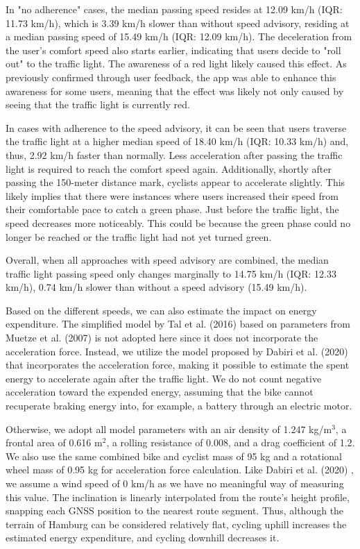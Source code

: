 In "no adherence" cases, the median passing speed resides at 12.09 km/h (IQR: 11.73 km/h), which is 3.39 km/h slower than without speed advisory, residing at a median passing speed of 15.49 km/h (IQR: 12.09 km/h). The deceleration from the user's comfort speed also starts earlier, indicating that users decide to "roll out" to the traffic light. The awareness of a red light likely caused this effect. As previously confirmed through user feedback, the app was able to enhance this awareness for some users, meaning that the effect was likely not only caused by seeing that the traffic light is currently red.

In cases with adherence to the speed advisory, it can be seen that users traverse the traffic light at a higher median speed of 18.40 km/h (IQR: 10.33 km/h) and, thus, 2.92 km/h faster than normally. Less acceleration after passing the traffic light is required to reach the comfort speed again. Additionally, shortly after passing the 150-meter distance mark, cyclists appear to accelerate slightly. This likely implies that there were instances where users increased their speed from their comfortable pace to catch a green phase. Just before the traffic light, the speed decreases more noticeably. This could be because the green phase could no longer be reached or the traffic light had not yet turned green.

Overall, when all approaches with speed advisory are combined, the median traffic light passing speed only changes marginally to 14.75 km/h (IQR: 12.33 km/h), 0.74 km/h slower than without a speed advisory (15.49 km/h). 

Based on the different speeds, we can also estimate the impact on energy expenditure. The simplified model by Tal et al. (2016) \cite{tal_vehicular-communications-based_2016} based on parameters from Muetze et al. (2007) \cite{muetze_electric_2007} is not adopted here since it does not incorporate the acceleration force. Instead, we utilize the model proposed by Dabiri et al. (2020) \cite{dabiri_optimized_2020} that incorporates the acceleration force, making it possible to estimate the spent energy to accelerate again after the traffic light. We do not count negative acceleration toward the expended energy, assuming that the bike cannot recuperate braking energy into, for example, a battery through an electric motor.

Otherwise, we adopt all model parameters with an air density of 1.247 kg/m$^3$, a frontal area of 0.616 m$^2$, a rolling resistance of 0.008, and a drag coefficient of 1.2. We also use the same combined bike and cyclist mass of 95 kg and a rotational wheel mass of 0.95 kg for acceleration force calculation. Like Dabiri et al. (2020) \cite{dabiri_optimized_2020}, we assume a wind speed of 0 km/h as we have no meaningful way of measuring this value. The inclination is linearly interpolated from the route's height profile, snapping each GNSS position to the nearest route segment. Thus, although the terrain of Hamburg can be considered relatively flat, cycling uphill increases the estimated energy expenditure, and cycling downhill decreases it.

